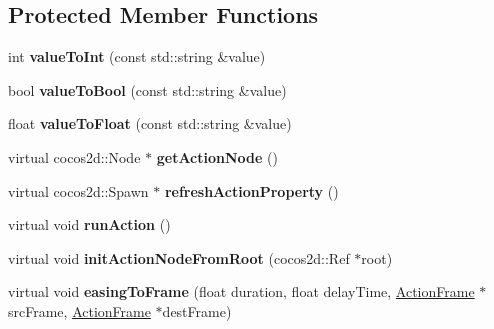\subsection*{Protected Member Functions}
\begin{DoxyCompactItemize}
\item 
\mbox{\label{classcocostudio_1_1ActionNode_ac8200229cdb1c5ce27db2bbc778f4c50}} 
int {\bfseries value\+To\+Int} (const std\+::string \&value)
\item 
\mbox{\label{classcocostudio_1_1ActionNode_a3929a6071bd32fe30ef2c2b2d07c65b0}} 
bool {\bfseries value\+To\+Bool} (const std\+::string \&value)
\item 
\mbox{\label{classcocostudio_1_1ActionNode_a5d305b5a9faa5923f570cbd687f98ffb}} 
float {\bfseries value\+To\+Float} (const std\+::string \&value)
\item 
\mbox{\label{classcocostudio_1_1ActionNode_ae5ec54a30627eeaf5df120c5d667e546}} 
virtual cocos2d\+::\+Node $\ast$ {\bfseries get\+Action\+Node} ()
\item 
\mbox{\label{classcocostudio_1_1ActionNode_a1f7683e9178b0c4f2b1daca19af51f12}} 
virtual cocos2d\+::\+Spawn $\ast$ {\bfseries refresh\+Action\+Property} ()
\item 
\mbox{\label{classcocostudio_1_1ActionNode_a9619bbeac5ace711851b6e1af0899266}} 
virtual void {\bfseries run\+Action} ()
\item 
\mbox{\label{classcocostudio_1_1ActionNode_a980caa151d6f21462257a00714c1b06f}} 
virtual void {\bfseries init\+Action\+Node\+From\+Root} (cocos2d\+::\+Ref $\ast$root)
\item 
\mbox{\label{classcocostudio_1_1ActionNode_aea5c6da6bea006adb8872e4b8e3b5157}} 
virtual void {\bfseries easing\+To\+Frame} (float duration, float delay\+Time, \hyperlink{classcocostudio_1_1ActionFrame}{Action\+Frame} $\ast$src\+Frame, \hyperlink{classcocostudio_1_1ActionFrame}{Action\+Frame} $\ast$dest\+Frame)
\item 

\end{DoxyCompactItemize}
